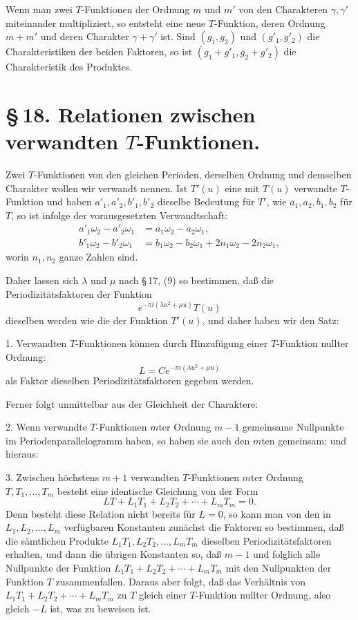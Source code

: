 \documentclass[11pt]{article}
\begin{document}
Wenn man zwei $T$-Funktionen der Ordnung $m$ und $m'$ von den Charakteren $\gamma,\gamma'$ miteinander multipliziert, so entsteht eine neue $T$-Funktion, deren Ordnung $m+m'$ und deren Charakter $\gamma+\gamma'$ ist. Sind $(g_1,g_2)$ und $(g'_1,g'_2)$ die Charakteristiken der beiden Faktoren, so ist $(g_1+g'_1,g_2+g'_2)$ die Charakteristik des Produktes.

\section*{\S\,18. Relationen zwischen verwandten $T$-Funktionen.}

Zwei $T$-Funktionen von den gleichen Perioden, derselben Ordnung und demselben Charakter wollen wir verwandt nennen. Ist $T'(u)$ eine mit $T(u)$ verwandte $T$-Funktion und haben $a'_1,a'_2,b'_1,b'_2$ dieselbe Bedeutung für $T'$, wie $a_1,a_2,b_1,b_2$ für $T$, so ist infolge der vorausgesetzten Verwandtschaft:
\begin{align}
a'_1\omega_2-a'_2\omega_1&=a_1\omega_2-a_2\omega_1,\tag{1}\\
b'_1\omega_2-b'_2\omega_1&=b_1\omega_2-b_2\omega_1+2n_1\omega_2-2n_2\omega_1,\tag{2}
\end{align}
worin $n_1,n_2$ ganze Zahlen sind.

Daher lassen sich $\lambda$ und $\mu$ nach \S\,17, (9) so bestimmen, daß die Periodizitätsfaktoren der Funktion
\[
e^{-\pi i(\lambda u^2+\mu u)}T(u)
\]
dieselben werden wie die der Funktion $T'(u)$, und daher haben wir den Satz:

1. Verwandten $T$-Funktionen können durch Hinzufügung einer $T$-Funktion nullter Ordnung:
\[
L=Ce^{-\pi i(\lambda u^2+\mu u)}
\]
als Faktor dieselben Periodizitätsfaktoren gegeben werden.

Ferner folgt unmittelbar aus der Gleichheit der Charaktere:

2. Wenn verwandte $T$-Funktionen $m$ter Ordnung $m-1$ gemeinsame Nullpunkte im Periodenparallelogramm haben, so haben sie auch den $m$ten gemeinsam; und hieraus:

3. Zwischen höchstens $m+1$ verwandten $T$-Funktionen $m$ter Ordnung $T,T_1,\ldots,T_m$ besteht eine identische Gleichung von der Form
\[
LT+L_1T_1+L_2T_2+\cdots+L_mT_m=0.
\]
Denn besteht diese Relation nicht bereits für $L=0$, so kann man von den in $L_1,L_2,\ldots,L_m$ verfügbaren Konstanten zunächst die Faktoren so bestimmen, daß die sämtlichen Produkte $L_1T_1,L_2T_2,\ldots,L_mT_m$ dieselben Periodizitätsfaktoren erhalten, und dann die übrigen Konstanten so, daß $m-1$ und folglich alle Nullpunkte der Funktion $L_1T_1+L_2T_2+\cdots+L_mT_m$ mit den Nullpunkten der Funktion $T$ zusammenfallen. Daraus aber folgt, daß das Verhältnis von $L_1T_1+L_2T_2+\cdots+L_mT_m$ zu $T$ gleich einer $T$-Funktion nullter Ordnung, also gleich $-L$ ist, was zu beweisen ist.
\end{document}
